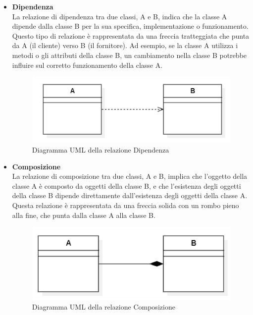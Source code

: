 \begin{itemize}
    \item \textbf{Dipendenza}
    \\La relazione di dipendenza tra due classi, A e B, indica che la classe A dipende dalla classe B per la sua specifica, implementazione o funzionamento. Questo tipo di relazione è rappresentata da una freccia tratteggiata che punta da A (il cliente) verso B (il fornitore). Ad esempio, se la classe A utilizza i metodi o gli attributi della classe B, un cambiamento nella classe B potrebbe influire sul corretto funzionamento della classe A. 
    \begin{figure}[h]
        \centering
        \includegraphics[width=0.5\linewidth]{img/dipendenza.PNG}
        \caption{Diagramma UML della relazione Dipendenza}
    \end{figure}
    
    \newpage
    
    \item \textbf{Composizione}
    \\La relazione di composizione tra due classi, A e B, implica che l'oggetto della classe A è composto da oggetti della classe B, e che l'esistenza degli oggetti della classe B dipende direttamente dall'esistenza degli oggetti della classe A. Questa relazione è rappresentata da una freccia solida con un rombo pieno alla fine, che punta dalla classe A alla classe B. 
    \begin{figure}[h]
        \centering
        \includegraphics[width=0.5\linewidth]{img/composizione.PNG}
        \caption{Diagramma UML della relazione Composizione}
    \end{figure}
    
    
    

\end{itemize}
